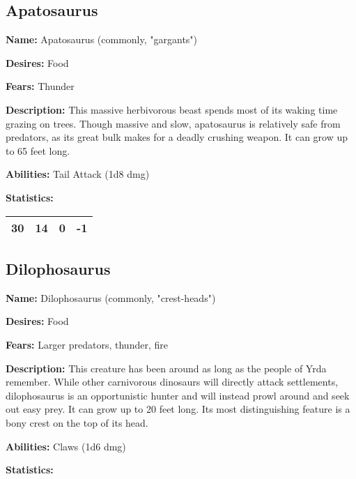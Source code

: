 \begin{multicols}{2}
\subsection{Apatosaurus}

\textbf{Name:} Apatosaurus (commonly, "gargants") 

\textbf{Desires:} Food

\textbf{Fears:} Thunder

\textbf{Description:} This massive herbivorous beast spends most of its waking time grazing on trees.
Though massive and slow, apatosaurus is relatively safe from predators, as its great bulk makes for a
deadly crushing weapon. It can grow up to 65 feet long.

\textbf{Abilities:} Tail Attack (1d8 dmg)

\textbf{Statistics:}

\begin{center}
{
\begin{xtabular}{|l|l|l|l|}
30 & 14 & 0 & -1 \\
\hline
\end{xtabular}
}
\end{center}

\subsection{Dilophosaurus}

\textbf{Name:} Dilophosaurus (commonly, "crest-heads") 

\textbf{Desires:} Food

\textbf{Fears:} Larger predators, thunder, fire

\textbf{Description:} This creature has been around as long as the people of Yrda remember.
While other carnivorous dinosaurs will directly attack settlements, dilophosaurus is an
opportunistic hunter and will instead prowl around and seek out easy prey. It can grow up
to 20 feet long. Its most distinguishing feature is a bony crest on the top of its head.

\textbf{Abilities:} Claws (1d6 dmg)

\textbf{Statistics:}


\end{multicols}
